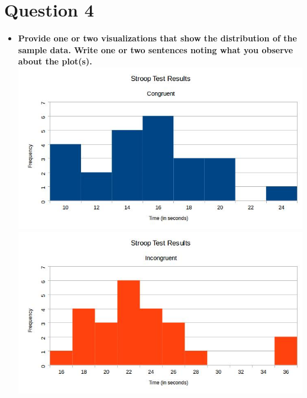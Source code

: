 \documentclass[a4paper,11pt]{report}
\begin{document}
\section{Question 4}
  \begin{itemize}
    \item \textbf{Provide one or two visualizations that show the distribution of the sample data.  Write one or two sentences noting what you observe about the plot(s).}\\
    \includegraphics[scale=.60]{congruent_histogram}\\
    \includegraphics[scale=.60]{incongruent_histogram}\\


\end{itemize}
\end{document}

